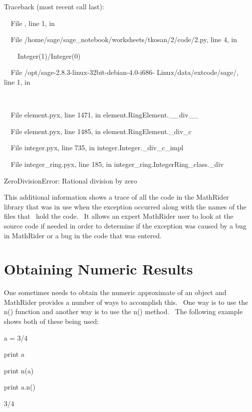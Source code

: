 \documentclass[12pt,twoside]{book}
\begin{document}
\bigskip

Traceback (most recent call last):

\ \ File {\textquotedbl}{\textquotedbl}, line 1, in 

\ \ File
{\textquotedbl}/home/sage/sage\_notebook/worksheets/tkosan/2/code/2.py{\textquotedbl},
 line 4, in 

\ \ \ \ Integer(1)/Integer(0)

\ \ File
{\textquotedbl}/opt/sage{}-2.8.3{}-linux{}-32bit{}-debian{}-4.0{}-i686{}-
Linux/data/extcode/sage/{\textquotedbl}, line 1, in 

\ \ \ \ 

\ \ File {\textquotedbl}element.pyx{\textquotedbl}, line 1471, in
element.RingElement.\_\_div\_\_

\ \ File {\textquotedbl}element.pyx{\textquotedbl}, line 1485, in
element.RingElement.\_div\_c

\ \ File {\textquotedbl}integer.pyx{\textquotedbl}, line 735, in
integer.Integer.\_div\_c\_impl

\ \ File {\textquotedbl}integer\_ring.pyx{\textquotedbl}, line 185, in
integer\_ring.IntegerRing\_class.\_div

ZeroDivisionError: Rational division by zero

This additional information shows a trace of all the code in the
MathRider library that was in use when the exception occurred along
with the names of the files that \ hold the code. \ It allows an expert
MathRider user to look at the source code if needed in order to
determine if the exception was caused by a bug in MathRider or a bug in
the code that was entered. \ 

\section[Obtaining Numeric Results]{Obtaining Numeric
Results}
One sometimes needs to obtain the numeric approximate of an object and
MathRider provides a number of ways to accomplish this. \ One way is to
use the n() function and another way is to use the n() method. \ The
following example shows both of these being used:


\bigskip

a = 3/4

print a

print n(a)

print a.n()

{\textbar}

3/4
\end{document}
